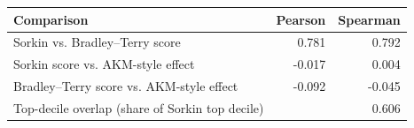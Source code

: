 \begin{tabularx}{\linewidth}{@{}Xrr@{}}
\toprule
Comparison & Pearson & Spearman \\
\midrule
Sorkin vs. Bradley--Terry score & 0.781 & 0.792 \\
Sorkin score vs. AKM-style effect & -0.017 & 0.004 \\
Bradley--Terry score vs. AKM-style effect & -0.092 & -0.045 \\
\addlinespace
Top-decile overlap (share of Sorkin top decile) & \multicolumn{2}{r}{0.606} \\
\bottomrule
\end{tabularx}
